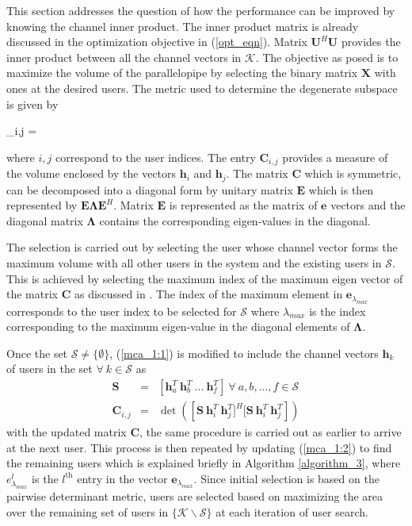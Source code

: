 
This section addresses the question of how the performance can be improved by knowing the channel inner product. The inner product matrix is already discussed in the optimization objective in (\ref{opt_eqn}). Matrix $\mathbf{U}^H \mathbf{U}$ provides the inner product between all the channel vectors in $\mathcal{K}$. The objective as posed is to maximize the volume of the parallelopipe by selecting the binary matrix $\mathbf{X}$  with ones at the desired users. The metric used to determine the degenerate subspace is given by
\begin{ceq}
_{i,j} = 
\label{mca_1:1}
\end{ceq}
where $i,j$ correspond to the user indices. The entry $\mathbf{C}_{i,j}$ provides a measure of the volume enclosed by the vectors $\mathbf{h}_i$ and $\mathbf{h}_j$. The matrix $\mathbf{C}$ which is symmetric, can be decomposed into a diagonal form by unitary matrix $\mathbf{E}$ which is then represented by $\mathbf{E} \mathbf{\Lambda} \mathbf{E}^H$. Matrix $\mathbf{E}$ is represented as the matrix of $\mathbf{e}$ vectors and the diagonal matrix $\mathbf{\Lambda}$ contains the corresponding eigen-values in the diagonal.

The selection is carried out by selecting the user whose channel vector forms the maximum volume with all other users in the system and the existing users in $\mathcal{S}$. This is achieved by selecting the maximum index of the maximum eigen vector of the matrix $\mathbf{C}$ as discussed in \cite{saaty2008decision}. The index of the maximum element in $\mathbf{e}_{\lambda_{max}}$ corresponds to the user index to be selected for $\mathcal{S}$ where $\lambda_{max}$ is the index corresponding to the maximum eigen-value in the diagonal elements of $\mathbf{\Lambda}$.

Once the set $\mathcal{S} \neq \{ \emptyset \}$, (\ref{mca_1:1}) is modified to include the channel vectors $\mathbf{h}_k$ of users in the set $\forall \ k \in \mathcal{S}$ as
\begin{eqnarray}
\mathbf{S} &=& [\mathbf{h}^T_a \ \mathbf{h}^T_b \ ... \ \mathbf{h}^T_f] \ \forall \ a,b,...,f \in \mathcal{S} \\
\mathbf{C}_{i,j} &=& \det{\left ( \left [ \mathbf{S} \ \mathbf{h}^T_i \ \mathbf{h}^T_j]^H [\mathbf{S} \ \mathbf{h}^T_i \ \mathbf{h}^T_j \right ] \right ) }
\label{mca_1:2}
\end{eqnarray}
with the updated matrix $\mathbf{C}$, the same procedure is carried out as earlier to arrive at the next user. This process is then repeated by updating (\ref{mca_1:2}) to find the remaining users which is explained briefly in Algorithm \ref{algorithm_3}, where $e^l_{\lambda_{max}}$ is the $l^{\mathrm{th}}$ entry in the vector $\mathbf{e}_{\lambda_{max}}$. Since initial selection is based on the pairwise determinant metric, users are selected based on maximizing the area over the remaining set of users in $\{ \mathcal{K} \backslash \mathcal{S} \}$ at each iteration of user search.

